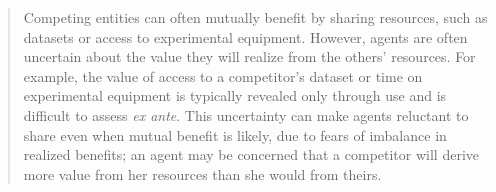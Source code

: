 \begin{abstract}




Competing entities can often mutually benefit by sharing resources, such as datasets or access to experimental equipment. 
However, agents are often uncertain about the value they will realize from the others' resources.
For example, the value of access to a competitor's dataset or time on experimental equipment is typically revealed only 
through use and is difficult to assess \emph{ex ante}. This uncertainty can make agents reluctant to share even when mutual 
benefit is likely, due to fears of imbalance in realized benefits; an agent may be concerned that a competitor will 
derive more value from her resources than she would from theirs.


\end{abstract}
